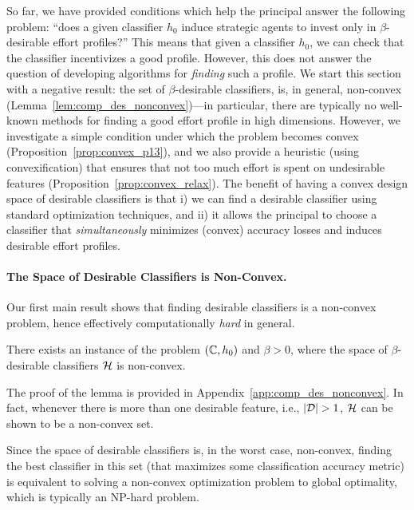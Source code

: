 So far, we have provided conditions which help the principal answer the following problem: ``does a given classifier $h_0$ induce strategic agents to invest only in $\beta$-desirable effort profiles?'' This means that given a classifier $h_0$, we can check that the classifier incentivizes a good profile. However, this does not answer the question of developing algorithms for \emph{finding} such a profile. We start this section with a negative result: the set of $\beta$-desirable classifiers, is, in general, non-convex (Lemma~\ref{lem:comp_des_nonconvex})---in particular, there are typically no well-known methods for finding a good effort profile in high dimensions. However, we investigate a simple condition under which the problem becomes convex (Proposition~\ref{prop:convex_p13}), and we also provide a heuristic (using convexification) that ensures that not too much effort is spent on undesirable features (Proposition~\ref{prop:convex_relax}). The benefit of having a convex design space of desirable classifiers is that i) we can find a desirable classifier using standard optimization techniques, and ii) it allows the principal to choose a classifier that \emph{simultaneously} minimizes (convex) accuracy losses and induces desirable effort profiles.

\paragraph{The Space of Desirable Classifiers is Non-Convex.}
Our first main result shows that finding desirable classifiers is a non-convex problem, hence effectively computationally \textit{hard} in general. 

\begin{lem}\label{lem:comp_des_nonconvex}
There exists an instance of the problem $(\mathbb{C},h_0)$ and $\beta > 0$, where the space of $\beta$-desirable classifiers $\mathcal{H}$ is non-convex.
\end{lem}


The proof of the lemma is provided in Appendix~\ref{app:comp_des_nonconvex}. In fact, whenever there is more than one desirable feature, i.e., $|\mathcal{D}| > 1$, $\mathcal{H}$ can be shown to be a non-convex set. 



Since the space of desirable classifiers is, in the worst case, non-convex, finding the best classifier in this set (that maximizes some classification accuracy metric) is equivalent to solving a non-convex optimization problem to global optimality, which is typically an NP-hard problem. 

